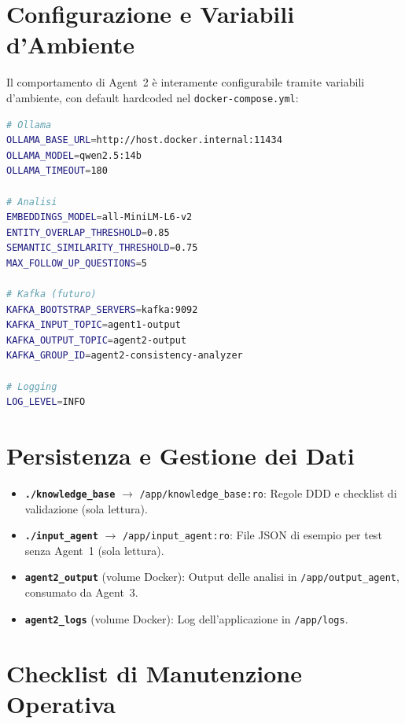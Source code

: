 \documentclass[12pt,a4paper]{report}
\begin{document}
\section{Configurazione e Variabili d'Ambiente}

Il comportamento di Agent~2 è interamente configurabile tramite variabili
d'ambiente, con default hardcoded nel \texttt{docker-compose.yml}:

\begin{lstlisting}[language=bash]
# Ollama
OLLAMA_BASE_URL=http://host.docker.internal:11434
OLLAMA_MODEL=qwen2.5:14b
OLLAMA_TIMEOUT=180

# Analisi
EMBEDDINGS_MODEL=all-MiniLM-L6-v2
ENTITY_OVERLAP_THRESHOLD=0.85
SEMANTIC_SIMILARITY_THRESHOLD=0.75
MAX_FOLLOW_UP_QUESTIONS=5

# Kafka (futuro)
KAFKA_BOOTSTRAP_SERVERS=kafka:9092
KAFKA_INPUT_TOPIC=agent1-output
KAFKA_OUTPUT_TOPIC=agent2-output
KAFKA_GROUP_ID=agent2-consistency-analyzer

# Logging
LOG_LEVEL=INFO
\end{lstlisting}

\section{Persistenza e Gestione dei Dati}

\begin{itemize}
  \item \textbf{\texttt{./knowledge\_base}} $\rightarrow$ \texttt{/app/knowledge\_base:ro}:
        Regole DDD e checklist di validazione (sola lettura).
  \item \textbf{\texttt{./input\_agent}} $\rightarrow$ \texttt{/app/input\_agent:ro}:
        File JSON di esempio per test senza Agent~1 (sola lettura).
  \item \textbf{\texttt{agent2\_output}} (volume Docker): Output delle analisi
        in \texttt{/app/output\_agent}, consumato da Agent~3.
  \item \textbf{\texttt{agent2\_logs}} (volume Docker): Log dell'applicazione
        in \texttt{/app/logs}.
\end{itemize}
\section{Checklist di Manutenzione Operativa}
\end{document}
